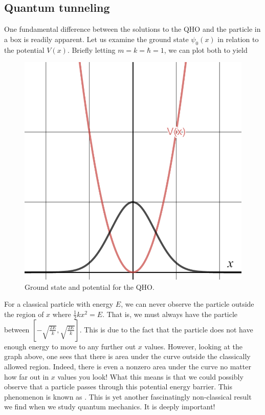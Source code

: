 \subsection{Quantum tunneling}
One fundamental difference between the solutions to the QHO and the particle in a box is readily apparent.  Let us examine the ground state $\psi_0(x)$ in relation to the potential $V(x)$.  Briefly letting $m = k = \hbar = 1$, we can plot both to yield
\begin{figure}[H]
    \centering
    \includegraphics[width=.6\textwidth]{Figures_Part_2/qho_ground_state.png}
    \caption{Ground state and potential for the QHO.}
\end{figure}
For a classical particle with energy $E$, we can never observe the particle outside the region of $x$ where $\frac{1}{2}kx^2=E$. That is, we must always have the particle between $\left[ -\sqrt{\frac{2E}{k}}, \sqrt{\frac{2E}{k}}\right]$.  This is due to the fact that the particle does not have enough energy to move to any further out $x$ values. However, looking at the graph above, one sees that there is area under the curve outside the classically allowed region.  Indeed, there is even a nonzero area under the curve no matter how far out in $x$ values you look! What this means is that we could possibly observe that a particle passes through this potential energy barrier.  This phenomenon is known as  . This is yet another fascinatingly non-classical result we find when we study quantum mechanics.  It is deeply important!
